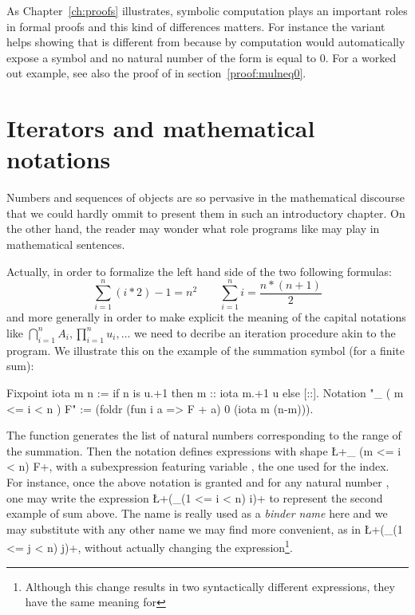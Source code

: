 As Chapter~\ref{ch:proofs} illustrates, symbolic computation plays an
important roles in formal proofs and this kind of differences
matters. For instance the  variant helps
showing that  is different from  because by
computation \Coq{} would automatically expose  a  symbol
and no natural number of the form  is equal to 0.
For a worked out example, see also the proof of  in
section~\ref{proof:mulneq0}.


\section{Iterators and mathematical notations}
\label{sec:bigopnat}

Numbers and sequences of objects are so pervasive in the mathematical
discourse that we could hardly ommit to present them in such an
introductory chapter. On the other hand, the reader may wonder what role
programs like  may play in mathematical sentences.

Actually, in order to formalize the left hand side of the two
following formulas:
$$
\sum_{i=1}^n (i * 2) - 1 = n ^ 2 \qquad
\sum_{i=1}^n i = \frac{n * (n + 1)}{2}
$$
and more generally in order to make explicit the meaning of the capital
notations like $\bigcap_{i=1}^nA_i,
\prod_{i=1}^nu_i, \dots$ we need to decribe an iteration procedure
akin to the  program. We illustrate this on the example of
the summation symbol (for a finite sum):

\begin{coq}{}{}
Fixpoint iota m n := if n is u.+1 then m :: iota m.+1 u else [::].
Notation "\sum_ ( m <= i < n ) F" :=
  (foldr (fun i a => F + a) 0 (iota m (n-m))).
\end{coq}
\index[coq]{\C{\\sum}}

The  function generates the list of natural numbers
corresponding to the range of the summation. Then the notation defines
expressions with shape \L+\sum_ (m <= i < n) F+, with  a
subexpression featuring variable , the one used for the
index. For instance, once the above notation is granted and for any
natural number , one may write
the \Coq{} expression \L+(\sum_(1 <= i < n) i)+ to represent the
second example of sum above. The name  is really used as a
\emph{binder name} here and we may substitute  with any other
name we may find more convenient, as in \L+(\sum_(1 <= j < n) j)+,
without actually changing the expression\footnote{Although this change
results in two syntactically different expressions, they have the same
meaning for \Coq{}}.


